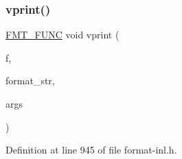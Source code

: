 \subsubsection{\texorpdfstring{vprint()}{vprint()}\hspace{0.1cm}{\footnotesize\ttfamily [1/4]}}
{\footnotesize\ttfamily \hyperlink{format_8h_a02c8898388e0ae59aab58be14fcd4e05}{F\+M\+T\+\_\+\+F\+U\+NC} void vprint (\begin{DoxyParamCaption}\item[{std\+::\+F\+I\+LE $\ast$}]{f,  }\item[{\hyperlink{core_8h_a17e3ff7f9ac2b8f068f719b829890036}{string\+\_\+view}}]{format\+\_\+str,  }\item[{\hyperlink{structformat__args}{format\+\_\+args}}]{args }\end{DoxyParamCaption})}



Definition at line 945 of file format-\/inl.\+h.

